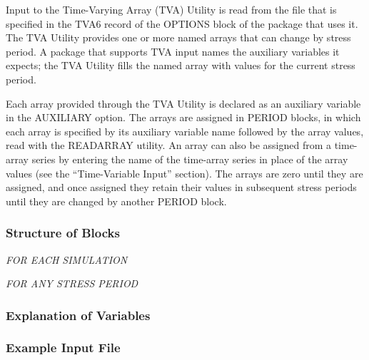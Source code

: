 Input to the Time-Varying Array (TVA) Utility is read from the file that is specified in the TVA6 record of the OPTIONS block of the package that uses it.  The TVA Utility provides one or more named arrays that can change by stress period.  A package that supports TVA input names the auxiliary variables it expects; the TVA Utility fills the named array with values for the current stress period.

Each array provided through the TVA Utility is declared as an auxiliary variable in the AUXILIARY option.  The arrays are assigned in PERIOD blocks, in which each array is specified by its auxiliary variable name followed by the array values, read with the READARRAY utility.  An array can also be assigned from a time-array series by entering the name of the time-array series in place of the array values (see the ``Time-Variable Input'' section).  The arrays are zero until they are assigned, and once assigned they retain their values in subsequent stress periods until they are changed by another PERIOD block.

\vspace{5mm}
\subsubsection{Structure of Blocks}
\vspace{5mm}

\noindent \textit{FOR EACH SIMULATION}

\vspace{5mm}
\noindent \textit{FOR ANY STRESS PERIOD}


\vspace{5mm}
\subsubsection{Explanation of Variables}
\begin{description}

\end{description}

\vspace{5mm}
\subsubsection{Example Input File}

